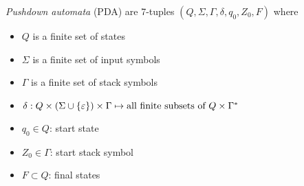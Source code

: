 \documentclass{imgs}
\begin{document}
\begin{definition}
  \textit{Pushdown automata} (PDA) are 7-tuples $(Q, \Sigma, \Gamma, \delta, q_0, Z_0, F)$ where
  \begin{itemize}
    \item $Q$ is a finite set of states
    \item $\Sigma$ is a finite set of input symbols
    \item $\Gamma$ is a finite set of stack symbols
    \item $\delta: Q \times (\Sigma \cup \{\varepsilon\}) \times \Gamma \mapsto \text{all finite subsets of } Q \times \Gamma^*$
    \item $q_0 \in Q$: start state
    \item $Z_0 \in \Gamma$: start stack symbol
    \item $F \subset Q$: final states
  \end{itemize}
\end{definition}
\end{document}
